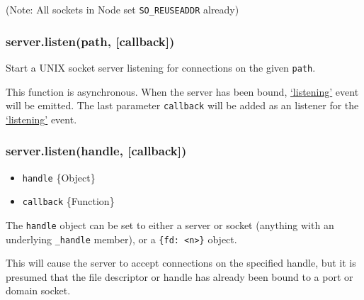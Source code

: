 \begin{Shaded}
\begin{Highlighting}[]
\NormalTok{(}\NormalTok{, } 
   \NormalTok{(} \NormalTok{== }\NormalTok{) \{}
    \NormalTok{(}\NormalTok{);}
     \NormalTok{() \{}
      \NormalTok{();}
    \NormalTok{\}, }\NormalTok{);}
  \NormalTok{\}}
\NormalTok{\});}
\end{Highlighting}
\end{Shaded}

(Note: All sockets in Node set \texttt{SO\_REUSEADDR} already)

\subsubsection{server.listen(path, {[}callback{]})}

Start a UNIX socket server listening for connections on the given
\texttt{path}.

This function is asynchronous. When the server has been bound,
\hyperref[net_event_listening]{`listening'} event will be emitted. The
last parameter \texttt{callback} will be added as an listener for the
\hyperref[net_event_listening]{`listening'} event.

\subsubsection{server.listen(handle, {[}callback{]})}

\begin{itemize}
\item
  \texttt{handle} \{Object\}
\item
  \texttt{callback} \{Function\}
\end{itemize}

The \texttt{handle} object can be set to either a server or socket
(anything with an underlying \texttt{\_handle} member), or a
\texttt{\{fd: \textless{}n\textgreater{}\}} object.

This will cause the server to accept connections on the specified
handle, but it is presumed that the file descriptor or handle has
already been bound to a port or domain socket.


